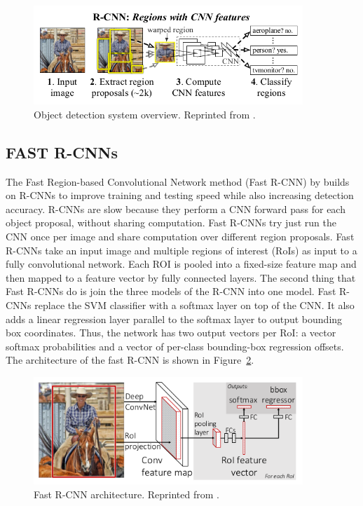 \begin{figure}[t]
  \centering
  \includegraphics[width=4in]{figures/rcnn.jpg}  
  \caption[Object detection system overview]{Object detection system overview. Reprinted from . }
  \label{fig:rcnn}
\end{figure}

\subsection{FAST R-CNNs}
The Fast Region-based Convolutional Network method (Fast R-CNN) by  builds on R-CNNs to improve training and testing speed while also increasing detection accuracy. R-CNNs are slow because they perform a CNN forward pass for each object proposal, without sharing computation. Fast R-CNNs try just run the CNN once per image and share computation over different region proposals. Fast R-CNNs take an input image and multiple regions of interest (RoIs) as input to a fully convolutional network. Each ROI is pooled into a fixed-size feature map and then mapped to a feature vector by fully connected layers. The second thing that Fast R-CNNs do is join the three models of the R-CNN into one model. Fast R-CNNs replace the SVM classifier with a softmax layer on top of the CNN. It also adds a linear regression layer parallel to the softmax layer to output bounding box coordinates. Thus, the network has two output vectors per RoI: a vector softmax probabilities and a vector of per-class bounding-box regression offsets. The architecture of the fast R-CNN is shown in Figure~\ref{fig:fastrcnn}. 

\begin{figure}[t]
  \centering
  \includegraphics[width=4in]{figures/fastrcnn.jpg}  
  \caption[FAST R-CNNs]{Fast R-CNN architecture. Reprinted from . }
  \label{fig:fastrcnn}
\end{figure}

